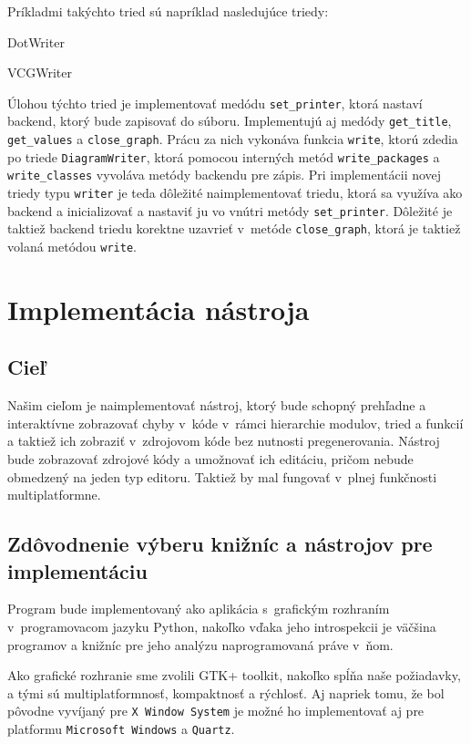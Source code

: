 \documentclass[11pt,oneside,final]{fithesis2}
\begin{document}
			Príkladmi takýchto tried sú napríklad nasledujúce triedy:
			    \begin{list}{•}{}
					\item DotWriter
					\item VCGWriter
    			\end{list}
    			
    	Úlohou týchto tried je implementovať medódu \texttt{set\_printer}, ktorá nastaví backend, ktorý bude zapisovať do súboru.
    	Implementujú aj medódy \texttt{get\_title},  \texttt{get\_values} a \texttt{close\_graph}.
    	Prácu za nich vykonáva funkcia \texttt{write}, ktorú zdedia po triede \texttt{DiagramWriter}, ktorá pomocou interných metód \texttt{write\_packages} a \texttt{write\_classes} vyvoláva metódy backendu pre zápis. Pri implementácii novej triedy typu \texttt{writer} je teda dôležité naimplementovať triedu, ktorá sa využíva ako backend a inicializovať a nastaviť ju vo vnútri metódy \texttt{set\_printer}.
    	Dôležité je taktiež backend triedu korektne uzavrieť v~metóde \texttt{close\_graph}, ktorá je taktiež volaná metódou \texttt{write}.
 
\chapter{Implementácia nástroja}
	\section{Cieľ}
	
	Našim cieľom je naimplementovať nástroj, ktorý bude schopný prehľadne a interaktívne zobrazovať chyby v~kóde v~rámci hierarchie modulov, tried a funkcií a taktiež ich zobraziť v~zdrojovom kóde bez nutnosti pregenerovania. Nástroj bude zobrazovať zdrojové kódy a umožnovať ich editáciu, pričom nebude obmedzený na jeden typ editoru. Taktiež by mal fungovať v~plnej funkčnosti multiplatformne.
	
	\section{Zdôvodnenie výberu knižníc a nástrojov pre implementáciu}
		Program bude implementovaný ako aplikácia s~grafickým rozhraním v~programovacom jazyku Python, nakoľko vďaka jeho introspekcii je väčšina programov a knižníc pre jeho analýzu naprogramovaná práve v~ňom.
		
		Ako grafické rozhranie sme zvolili GTK+ toolkit, nakoľko spĺňa naše požiadavky, a tými sú multiplatformnosť, kompaktnosť a rýchlosť. Aj napriek tomu, že bol pôvodne vyvíjaný pre \texttt{X Window System} je možné ho implementovať aj pre platformu \texttt{Microsoft Windows} a \texttt{Quartz}.
		
\end{document}
